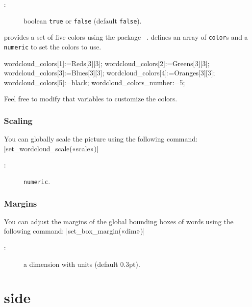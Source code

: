 \documentclass[english]{ltxdoc}
\begin{document}
\begin{description}
  \item[:] boolean \lstinline+true+ or \lstinline+false+ (default \lstinline+false+). 
\end{description}

 provides a set of five colors using the 
package ~\cite{ctan-metapost-colorbrewer}.
 defines an array of \lstinline+color+s and a
\lstinline+numeric+ to set the colors to use.
\begin{mpcode}
wordcloud_colors[1]:=Reds[3][3];
wordcloud_colors[2]:=Greens[3][3];
wordcloud_colors[3]:=Blues[3][3];
wordcloud_colors[4]:=Oranges[3][3];
wordcloud_colors[5]:=black;
wordcloud_colors_number:=5;
\end{mpcode} 
Feel free to modify that variables to customize the colors.

\subsubsection{Scaling}

You can globally scale the picture using the following command:
\commande|set_wordcloud_scale(«scale»)|\smallskip{}

\begin{description}
  \item[:] \lstinline+numeric+. 
\end{description}

\subsubsection{Margins}

You can adjust the margins of the global bounding boxes of words using the
following command:
\commande|set_box_margin(«dim»)|\smallskip{}

\begin{description}
  \item[:] a dimension with units (default 0.3pt). 
\end{description}



\section{ side}
\end{document}
